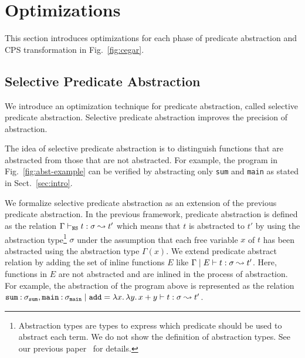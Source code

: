 
\section{Optimizations}
\label{sec:opt}

This section introduces optimizations for each phase of predicate
abstraction and CPS transformation in Fig.~\ref{fig:cegar}.

\subsection{Selective Predicate Abstraction}

We introduce an optimization technique for predicate abstraction, called
selective predicate abstraction.  Selective predicate abstraction
improves the precision of abstraction.

The idea of selective predicate abstraction is to distinguish functions
that are abstracted from those that are not abstracted.  For
example, the program in Fig.~\ref{fig:abst-example} can be verified by
abstracting only \texttt{sum} and \texttt{main} as stated in
Sect.~\ref{sec:intro}.

We formalize selective predicate abstraction as an extension of the
previous predicate abstraction.  In the previous framework, predicate
abstraction is defined as the relation
${\Gamma} \vdash_{\texttt{NS}} {t} : {\sigma} \leadsto {t'}$ which means that $t$ is abstracted to $t'$
by using the abstraction type\footnote{Abstraction types are types to
express which predicate should be used to abstract each term.  We do not show
the definition of abstraction types.  See our previous
paper~\cite{KobayashiPLDI2011} for details.}  $\sigma$ under the
assumption that each free variable $x$ of $t$ has been abstracted using
the abstraction type $\Gamma(x)$.  We extend predicate abstract relation
by adding the set of inline functions $E$ like
${\Gamma} \mid {E} \vdash {t} : {\sigma} \leadsto {t'}$.  Here, functions in $E$ are not
abstracted and are inlined in the process of abstraction.  For
example, the abstraction of the program above is represented as the
relation
${\mathtt{sum}\mathbin{:}\sigma_\mathtt{sum},\mathtt{main}\mathbin{:}\sigma_\mathtt{main}} \mid {\mathtt{add}=\lambda{x}.\,{\lambda{y}.\,{x+y}}} \vdash {t} : {\sigma} \leadsto {t'}$.

